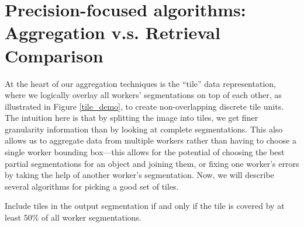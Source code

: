 \section{Precision-focused algorithms: Aggregation v.s. Retrieval Comparison}

At the heart of our aggregation techniques is the ``tile'' data representation, where we logically overlay all workers' segmentations on top of each other, as illustrated in Figure \ref{tile_demo}, to create non-overlapping discrete tile units. The intuition here is that by splitting the image into tiles, we get finer granularity information than by looking at complete segmentations. This also allows us to aggregate data from multiple workers rather than having to choose a single worker bounding box---this allows for the potential of choosing the best partial segmentations for an object and joining them, or fixing one worker's errors by taking the help of another worker's segmentation. Now, we will describe several algorithms for picking a good set of tiles.


Include tiles in the output segmentation if and only if the tile is covered by at least 50\% of all worker segmentations.


